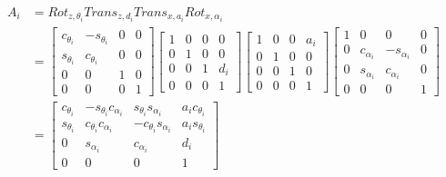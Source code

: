 \begin{equation}
\begin{split}
A_i  & = Rot_{z,\theta_{i}}Trans_{z,d_{i}}Trans_{x,a_{i}}Rot_{x,\alpha_{i}} \\
     & = \begin{bmatrix}c_{\theta_{i}} & -s_{\theta_{i}} & 0 & 0 \\ s_{\theta_{i}} & c_{\theta_{i}} & 0 & 0\\  0 &0 & 1 &0 \\ 0 &0&0& 1\end{bmatrix} 
      \begin{bmatrix}1 &0& 0& 0\\ 0& 1& 0& 0\\ 0& 0& 1& d_{i}\\ 0& 0& 0& 1\end{bmatrix} 
      \begin{bmatrix} 1 & 0 &0& a_{i}\\ 0& 1& 0 &0\\ 0 &0 &1& 0\\ 0 &0& 0 &1\end{bmatrix}
      \begin{bmatrix}1& 0& 0& 0\\0& c_{\alpha_{i}}& -s_{\alpha_{i}} & 0\\ 0 & s_{\alpha_{i}} & c_{\alpha_{i}} & 0\\ 0& 0 &0& 1 \end{bmatrix}\\
     & = \begin{bmatrix}c_{\theta_i}& -s_{\theta_i}c_{\alpha_i}& s_{\theta_i}s_{\alpha_i}& a_{i}c_{\theta_i}\\ s_{\theta_i}& c_{\theta_i}c_{\alpha_i} & -c_{\theta_i}s_{\alpha_i}& a_{i}s_{\theta_i}\\ 0 & s_{\alpha_i}& c_{\alpha_i} & d_{i}\\ 0& 0& 0& 1\end{bmatrix}
\end{split}
\label{equ:DH_trans_matrix}
\end{equation}



